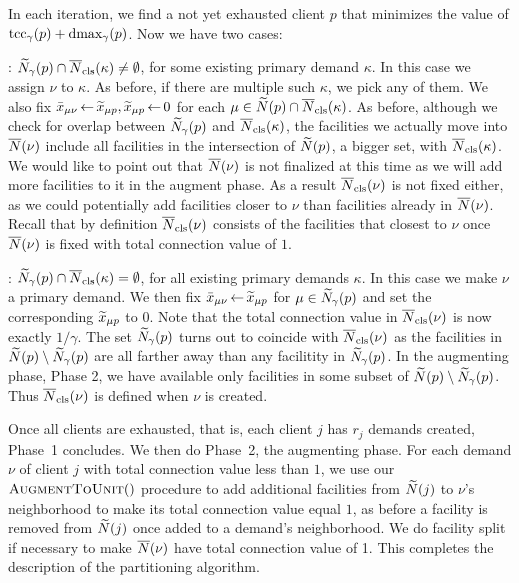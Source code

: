 \documentclass[11pt]{article}
\begin{document}
In each iteration, we find a not yet exhausted client $p$ that minimizes the
value of $\textrm{tcc}_\gamma(p) + \text{dmax}_\gamma(p)$. Now we have two cases:

\begin{description}

\item{:} ${\widetilde N}_{\gamma}(p) \cap
  {\overline{N}}_{\text{cls}}(\kappa)\neq\emptyset$, for some existing primary demand
  $\kappa$.  In this case we assign $\nu$ to $\kappa$. As before, if
  there are multiple such $\kappa$, we pick any of them. We also fix
  ${\bar x}_{\mu \nu} {\,\leftarrow\,} {\widetilde x}_{\mu p}, {\widetilde x}_{\mu p}{\,\leftarrow\,} 0$
  for each $\mu \in {\widetilde N}(p)\cap {\overline{N}}_{\text{cls}}(\kappa)$. As before,
  although we check for overlap between ${\widetilde N}_{\gamma}(p)$ and
  ${\overline{N}}_{\text{cls}}(\kappa)$, the facilities we actually move into
  ${\overline{N}}(\nu)$ include all facilities in the intersection of
  ${\widetilde N}(p)$, a bigger set, with ${\overline{N}}_{\text{cls}}(\kappa)$. We would
  like to point out that ${\overline{N}}(\nu)$ is not finalized at this time
  as we will add more facilities to it in the augment phase. As a
  result ${\overline{N}}_{\text{cls}}(\nu)$ is not fixed either, as we could
  potentially add facilities closer to $\nu$ than facilities already
  in ${\overline{N}}(\nu)$. Recall that by definition ${\overline{N}}_{\text{cls}}(\nu)$
  consists of the facilities that closest to $\nu$ once ${\overline{N}}(\nu)$
  is fixed with total connection value of $1$.

\item{:} ${\widetilde N}_{\gamma}(p) \cap {\overline{N}}_{\text{cls}}(\kappa) =
  \emptyset$, for all existing primary demands $\kappa$.  In this case
  we make $\nu$ a primary demand. We then fix ${\bar x}_{\mu \nu}{\,\leftarrow\,}
  {\widetilde x}_{\mu p}$ for $\mu \in {\widetilde N}_{\gamma}(p)$ and set the
  corresponding ${\widetilde x}_{\mu p}$ to $0$.  Note that the total
  connection value in ${\overline{N}}_{\text{cls}}(\nu)$ is now exactly $1/\gamma$.
  The set ${\widetilde N}_{\gamma}(p)$ turns out to coincide with
  ${\overline{N}}_{\text{cls}}(\nu)$ as the facilities in ${\widetilde N}(p) \setminus
  {\widetilde N}_{\gamma}(p)$ are all farther away than any facilitity in
  ${\widetilde N}_{\gamma}(p)$. In the augmenting phase, Phase 2, we have
  available only facilities in some subset of ${\widetilde N}(p) \setminus
  {\widetilde N}_{\gamma}(p)$. Thus ${\overline{N}}_{\text{cls}}(\nu)$ is defined when $\nu$
  is created.
\end{description}

Once all clients are exhausted, that is, each client $j$ has $r_j$
demands created, Phase~1 concludes. We then do Phase~2, the augmenting
phase.  For each demand $\nu$ of client $j$ with total connection
value less than $1$, we use our ${\textsc{AugmentToUnit}}()$ procedure to add
additional facilities from ${\widetilde N}(j)$ to $\nu$'s neighborhood to
make its total connection value equal $1$, as before a facility is
removed from ${\widetilde N}(j)$ once added to a demand's neighborhood. We
do facility split if necessary to make ${\overline{N}}(\nu)$ have total
connection value of 1.  This completes the description of the
partitioning algorithm.
\end{document}
